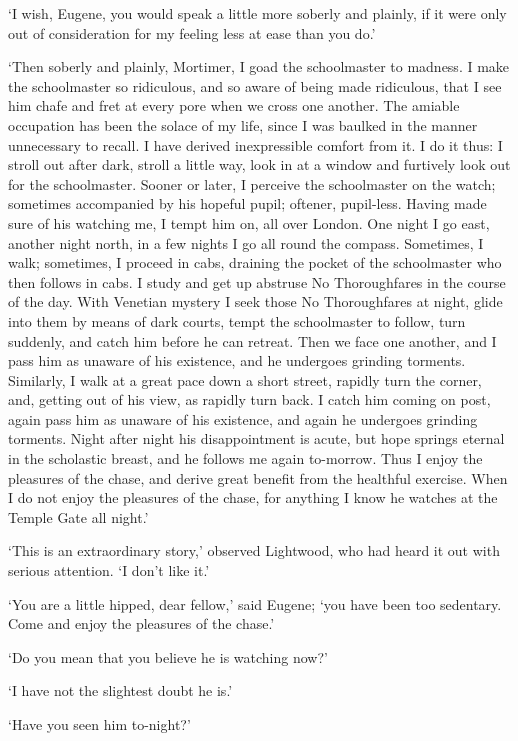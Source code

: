 ‘I wish, Eugene, you would speak a little more soberly and plainly, if
it were only out of consideration for my feeling less at ease than you
do.’

‘Then soberly and plainly, Mortimer, I goad the schoolmaster to madness.
I make the schoolmaster so ridiculous, and so aware of being made
ridiculous, that I see him chafe and fret at every pore when we cross
one another. The amiable occupation has been the solace of my life,
since I was baulked in the manner unnecessary to recall. I have derived
inexpressible comfort from it. I do it thus: I stroll out after dark,
stroll a little way, look in at a window and furtively look out for the
schoolmaster. Sooner or later, I perceive the schoolmaster on the watch;
sometimes accompanied by his hopeful pupil; oftener, pupil-less. Having
made sure of his watching me, I tempt him on, all over London. One
night I go east, another night north, in a few nights I go all round the
compass. Sometimes, I walk; sometimes, I proceed in cabs, draining the
pocket of the schoolmaster who then follows in cabs. I study and get
up abstruse No Thoroughfares in the course of the day. With Venetian
mystery I seek those No Thoroughfares at night, glide into them by means
of dark courts, tempt the schoolmaster to follow, turn suddenly, and
catch him before he can retreat. Then we face one another, and I pass
him as unaware of his existence, and he undergoes grinding torments.
Similarly, I walk at a great pace down a short street, rapidly turn the
corner, and, getting out of his view, as rapidly turn back. I catch him
coming on post, again pass him as unaware of his existence, and again
he undergoes grinding torments. Night after night his disappointment is
acute, but hope springs eternal in the scholastic breast, and he follows
me again to-morrow. Thus I enjoy the pleasures of the chase, and derive
great benefit from the healthful exercise. When I do not enjoy the
pleasures of the chase, for anything I know he watches at the Temple
Gate all night.’

‘This is an extraordinary story,’ observed Lightwood, who had heard it
out with serious attention. ‘I don’t like it.’

‘You are a little hipped, dear fellow,’ said Eugene; ‘you have been too
sedentary. Come and enjoy the pleasures of the chase.’

‘Do you mean that you believe he is watching now?’

‘I have not the slightest doubt he is.’

‘Have you seen him to-night?’


